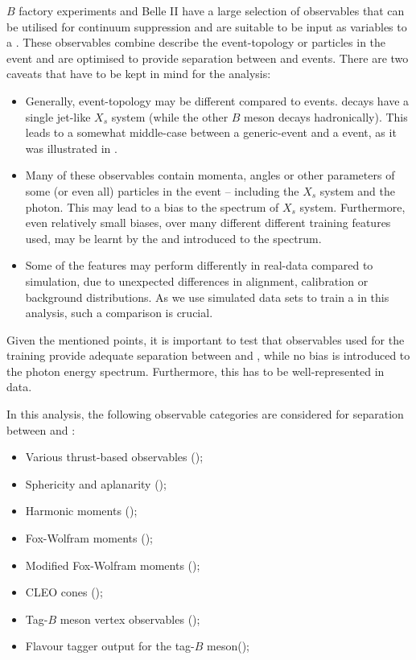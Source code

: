 $B$ factory experiments and Belle II have a large selection of observables that can be utilised for continuum suppression and are suitable to be input as variables to a \BDT.
These observables combine describe the event-topology or particles in the event and are optimised to provide separation between \BB and \qqbar events.
There are two caveats that have to be kept in mind for the \BtoXsgamma analysis:
\begin{itemize}
    \item Generally, \BtoXsgamma event-topology may be different compared to \BB events. 
    \BtoXsgamma decays have a single jet-like $X_s$ system (while the other $B$ meson decays hadronically).
    This leads to a somewhat middle-case between a generic-\BB event and a \epem\ra\qqbar event, as it was illustrated in .
    \item Many of these observables contain momenta, angles or other parameters of some (or even all) particles in the event -- including the $X_s$ system and the photon.
    This may lead to a bias to the spectrum of $X_s$ system.
    Furthermore, even relatively small biases, over many different different training features used, may be learnt by the \BDT and introduced to the spectrum.
    \item Some of the features may perform differently in real-data compared to simulation, due to unexpected differences in alignment, calibration or background distributions.
    As we use simulated data sets to train a \BDT in this analysis, such a comparison is crucial.
\end{itemize}
Given the mentioned points, it is important to test that observables used for the training provide adequate separation between \BtoXsgamma and \qqbar, while no bias is introduced to the photon energy spectrum.
Furthermore, this has to be well-represented in data.

In this analysis, the following observable categories are considered for separation between \epem\ra\qqbar and \BtoXsgamma:
\begin{itemize}
    \item Various thrust-based observables ();
    \item Sphericity and aplanarity ();
    \item Harmonic moments ();
    \item Fox-Wolfram moments ();
    \item Modified Fox-Wolfram moments ();
    \item CLEO cones ();
    \item Tag-$B$ meson vertex observables ();
    \item Flavour tagger output for the tag-$B$ meson();
\end{itemize}

